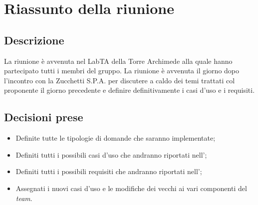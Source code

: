 \section{Riassunto della riunione}
\subsection{Descrizione}
La riunione è avvenuta nel LabTA della Torre Archimede alla quale hanno partecipato tutti i membri del gruppo. La riunione è avvenuta il giorno dopo l'incontro con la Zucchetti S.P.A. per discutere a caldo dei temi trattati col proponente il giorno precedente e definire definitivamente i casi d'uso e i requisiti.
\subsection{Decisioni prese}
\begin{itemize}
\item Definite tutte le tipologie di domande che saranno implementate;
\item Definiti tutti i possibili casi d'uso che andranno riportati nell'\AdR;
\item Definiti tutti i possibili requisiti che andranno riportati nell'\AdR;
\item Assegnati i nuovi casi d'uso e le modifiche dei vecchi ai vari componenti del \textit{team}.
\end{itemize}